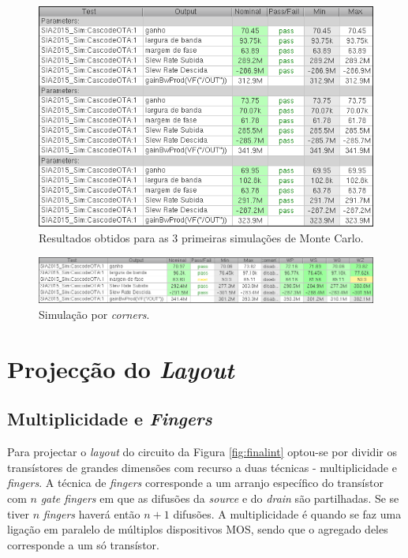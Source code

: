 \documentclass[11pt]{article}
\numberwithin{equation}{section}
\begin{document}
\begin{figure}[H]
	\centering
	\includegraphics[keepaspectratio=true, scale=0.65]{exps/MonteCarlo_3pt_Novo}
	\vspace{-0.5em}
	\caption{Resultados obtidos para as 3 primeiras simulações de Monte Carlo.}
	\vspace{-0.8em}
\end{figure} 

\begin{figure}[H]
	\centering
	\includegraphics[keepaspectratio=true, scale=0.65]{exps/Corners_Novo_semDiv}
	\vspace{-0.5em}
	\caption{Simulação por \textit{corners}.}
	\vspace{-0.8em}
\end{figure} 


\section{Projecção do \textit{Layout}}

\subsection{Multiplicidade e \textit{Fingers}}

Para projectar o \textit{layout} do circuito da Figura \ref{fig:finalint} optou-se por dividir os transístores de grandes dimensões com recurso a duas técnicas - multiplicidade e \textit{fingers}. A técnica de \textit{fingers} corresponde a um arranjo específico do transístor com $n$ \textit{gate fingers} em que as difusões da \textit{source} e do \textit{drain} são partilhadas. Se se tiver $n$ \textit{fingers} haverá então $n+1$ difusões. A multiplicidade é quando se faz uma ligação em paralelo de múltiplos dispositivos MOS, sendo que o agregado deles corresponde a um só transístor. 
\end{document}
